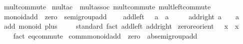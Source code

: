 \begin{isabellebody}
\isanewline
{}\isamarkupfalse%
\isanewline
\isanewline
{}\isamarkupfalse%
\ mult{\isacharunderscore}{\kern0pt}commute\isanewline
\isanewline
{}\isamarkupfalse%
\ mult{\isacharunderscore}{\kern0pt}ac\ {\isacharequal}{\kern0pt}\ mult{\isachardot}{\kern0pt}assoc\ mult{\isachardot}{\kern0pt}commute\ mult{\isachardot}{\kern0pt}left{\isacharunderscore}{\kern0pt}commute\isanewline
\isanewline
{}\isamarkupfalse%
\ monoid{\isacharunderscore}{\kern0pt}add\ {\isacharequal}{\kern0pt}\ zero\ {\isacharplus}{\kern0pt}\ semigroup{\isacharunderscore}{\kern0pt}add\ {\isacharplus}{\kern0pt}\isanewline
\ \ \ add{\isacharunderscore}{\kern0pt}{}{\isacharunderscore}{\kern0pt}left{\isacharcolon}{\kern0pt}\ {\isachardoublequoteopen}{}\ {\isacharplus}{\kern0pt}\ a\ {\isacharequal}{\kern0pt}\ a{\isachardoublequoteclose}\isanewline
\ \ \ \ \ add{\isacharunderscore}{\kern0pt}{}{\isacharunderscore}{\kern0pt}right{\isacharcolon}{\kern0pt}\ {\isachardoublequoteopen}a\ {\isacharplus}{\kern0pt}\ {}\ {\isacharequal}{\kern0pt}\ a{\isachardoublequoteclose}\isanewline
{}\isanewline
\isanewline
{}\isamarkupfalse%
\ add{\isacharcolon}{\kern0pt}\ monoid\ plus\ {}\isanewline
%
\isadelimproof
\ \ %
\endisadelimproof
%
\isatagproof
{}\isamarkupfalse%
\ standard\ {\isacharparenleft}{\kern0pt}fact\ add{\isacharunderscore}{\kern0pt}{}{\isacharunderscore}{\kern0pt}left\ add{\isacharunderscore}{\kern0pt}{}{\isacharunderscore}{\kern0pt}right{\isacharparenright}{\kern0pt}{\isacharplus}{\kern0pt}%
\endisatagproof
{\isafoldproof}%
%
\isadelimproof
\isanewline
%
\endisadelimproof
\isanewline
{}\isamarkupfalse%
\isanewline
\isanewline
{}\isamarkupfalse%
\ zero{\isacharunderscore}{\kern0pt}reorient{\isacharcolon}{\kern0pt}\ {\isachardoublequoteopen}{}\ {\isacharequal}{\kern0pt}\ x\ {\isasymlongleftrightarrow}\ x\ {\isacharequal}{\kern0pt}\ {}{\isachardoublequoteclose}\isanewline
%
\isadelimproof
\ \ %
\endisadelimproof
%
\isatagproof
{}\isamarkupfalse%
\ {\isacharparenleft}{\kern0pt}fact\ eq{\isacharunderscore}{\kern0pt}commute{\isacharparenright}{\kern0pt}%
\endisatagproof
{\isafoldproof}%
%
\isadelimproof
\isanewline
%
\endisadelimproof
\isanewline
{}\isamarkupfalse%
\ comm{\isacharunderscore}{\kern0pt}monoid{\isacharunderscore}{\kern0pt}add\ {\isacharequal}{\kern0pt}\ zero\ {\isacharplus}{\kern0pt}\ ab{\isacharunderscore}{\kern0pt}semigroup{\isacharunderscore}{\kern0pt}add\ {\isacharplus}{\kern0pt}\isanewline

\end{isabellebody}
